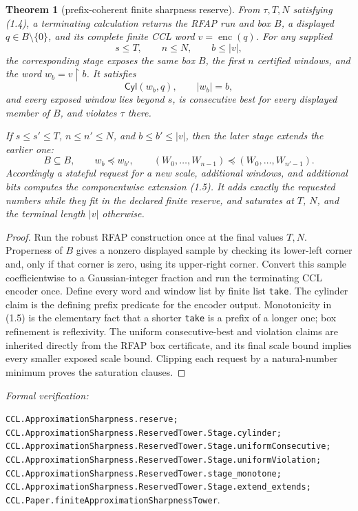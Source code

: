 \documentclass[10pt]{article}
\newtheorem{theorem}{Theorem}[section]
\theoremstyle{definition}
\theoremstyle{remark}
\newcommand{\pref}{\preccurlyeq}
\newcommand{\Cyl}{\mathsf{Cyl}}
\newcommand{\leanref}[1]{\par\smallskip\noindent
  \emph{Formal verification:}\par\nobreak
  {\raggedright\nolinkurl{#1}.\par}}
\begin{document}
\begin{theorem}[prefix-coherent finite sharpness reserve]
\label{thm:ccl-sharpness-reserve}
From $\tau,T,N$ satisfying (1.4), a terminating calculation returns the RFAP
run and box $B$, a displayed $q\in B\setminus\{0\}$, and its complete finite
CCL word $v=\operatorname{enc}(q)$.  For any supplied
\[
       s\le T,\qquad n\le N,\qquad b\le |v|,
\]
the corresponding stage exposes the same box $B$, the first $n$ certified
windows, and the word $w_b=v\mathbin{\upharpoonright}b$.  It satisfies
\[
 \Cyl(w_b,q),\qquad |w_b|=b,
\]
and every exposed window lies beyond $s$, is consecutive best for every
displayed member of $B$, and violates $\tau$ there.

If $s\le s'\le T$, $n\le n'\le N$, and $b\le b'\le|v|$, then the later stage
extends the earlier one:
\[
 B\subseteq B,\qquad w_b\pref w_{b'},\qquad
 (W_0,\ldots,W_{n-1})\pref(W_0,\ldots,W_{n'-1}).
\tag{1.5}
\]
Accordingly a stateful request for a new scale, additional windows, and
additional bits computes the componentwise extension (1.5).  It adds exactly
the requested numbers while they fit in the declared finite reserve, and
saturates at $T$, $N$, and the terminal length $|v|$ otherwise.
\end{theorem}

\begin{proof}
Run the robust RFAP construction once at the final values $T,N$.  Properness
of $B$ gives a nonzero displayed sample by checking its lower-left corner and,
only if that corner is zero, using its upper-right corner.  Convert this
sample coefficientwise to a Gaussian-integer fraction and run the terminating
CCL encoder once.  Define every word and window list by finite list
\texttt{take}.  The cylinder claim is the defining prefix predicate for the
encoder output.  Monotonicity in (1.5) is the elementary fact that a shorter
\texttt{take} is a prefix of a longer one; box refinement is reflexivity.
The uniform consecutive-best and violation claims are inherited directly
from the RFAP box certificate, and its final scale bound implies every smaller
exposed scale bound.  Clipping each request by a natural-number minimum proves
the saturation clauses.
\end{proof}

\leanref{CCL.ApproximationSharpness.reserve;
CCL.ApproximationSharpness.ReservedTower.Stage.cylinder;
CCL.ApproximationSharpness.ReservedTower.Stage.uniformConsecutive;
CCL.ApproximationSharpness.ReservedTower.Stage.uniformViolation;
CCL.ApproximationSharpness.ReservedTower.stage_monotone;
CCL.ApproximationSharpness.ReservedTower.Stage.extend_extends;
CCL.Paper.finiteApproximationSharpnessTower}
\end{document}
